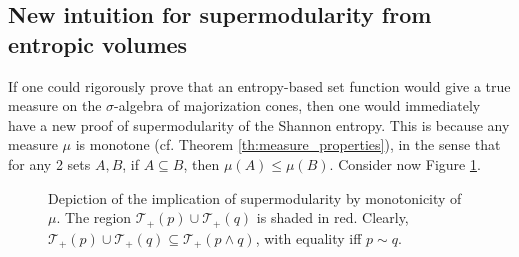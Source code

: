 \subsection{New intuition for supermodularity from entropic volumes} \label{sec:supermodularity_intuition}

If one could rigorously prove that an entropy-based set function would give a true measure on the $\sigma$-algebra of majorization cones, then one would immediately have a new proof of supermodularity of the Shannon entropy. This is because any measure $\mu$ is monotone (cf. Theorem \ref{th:measure_properties}), in the sense that for any 2 sets $A, B$, if $A \subseteq B$, then $\mu(A) \leq \mu(B)$. Consider now Figure \ref{fig:volumic_supermodularity}.

\begin{figure}[h!]
    \centering
        \caption{Depiction of the implication of supermodularity by monotonicity of $\mu$. The region $\mathcal{T}_+(p) \cup \mathcal{T}_+(q)$ is shaded in red. Clearly, $\mathcal{T}_+(p) \cup \mathcal{T}_+(q) \subseteq \mathcal{T}_+(p \wedge q)$, with equality iff $p \sim q$.}
        \label{fig:volumic_supermodularity}
\end{figure}

